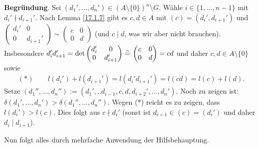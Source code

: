 \documentclass[../../main.tex]{subfiles}
\begin{document}
\begin{cproof}
\begin{tcolorbox}[arc=0mm, boxrule=0.2mm]
        \noindent\textbf{Begründung}. Sei $(d_1',\ldots ,d_n')\in (A\setminus\{0\})^n\setminus G$. Wähle $i\in\{1,\ldots ,n-1\}$ mit $d_i'\nmid d_{i+1}'$. Nach Lemma \ref{17.1.7} gibt es $c,d\in A$ mit $(c)=(d_i',d_{i+1}')$ und $\begin{pmatrix*}d_i'&0\\ 0&d_{i+1}'\end{pmatrix*}\sim\begin{pmatrix*}c&0\\ 0&d\end{pmatrix*}$ (und $c\mid d$, was wir aber nicht brauchen). Insbesondere $d_i'd_{i+1}'=\det\begin{pmatrix*}d_i'&0\\ 0&d_{i+1}'\end{pmatrix*}\divi\begin{pmatrix*}c&0\\ 0&d\end{pmatrix*}=cd$ und daher $c,d\in A\setminus\{0\}$ sowie
        \begin{align*}
            (*)\qquad l(d_i')+l(d_{i+1}')=l(d_i'd_{i+1}')=l(cd)=l(c)+l(d).
        \end{align*}
        Setze $(d_1'',\ldots ,d_n''):=(d_1',..d_{i-1},c,d,d_{i+2}',\ldots ,d_n')$. Noch zu zeigen ist: $\delta(d_1',\ldots ,d_n')>\delta(d_1'',\ldots ,d_n'')$. Wegen (*) reicht es zu zeigen, dass $l(d_i')>l(c)$. Dies folgt aus $c\nmid d_i'$ (sonst ist $d_{i+1}\in (c)=(d_i')$ und daher $d_i\mid d_{i+1}$).
    \end{tcolorbox}

    \noindent Nun folgt alles durch mehrfache Anwendung der Hilfsbehauptung.
\end{cproof}
\end{document}
